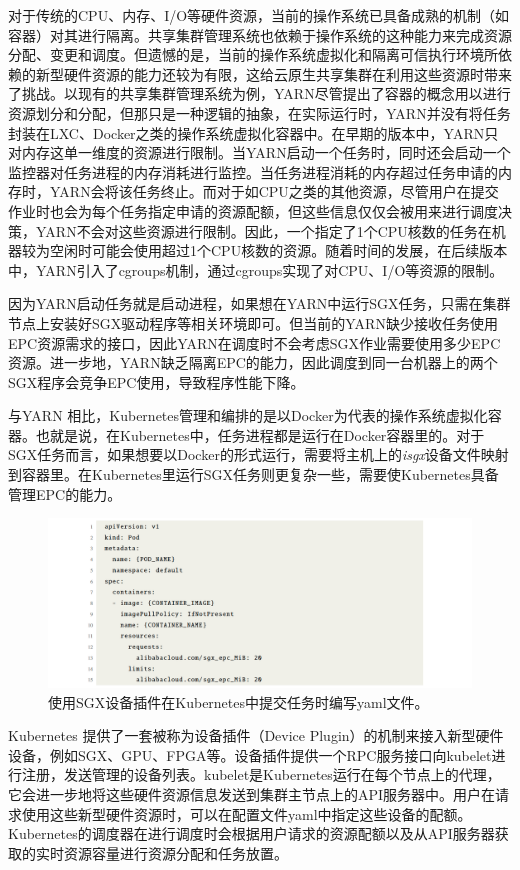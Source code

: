 对于传统的CPU、内存、I/O等硬件资源，当前的操作系统已具备成熟的机制（如容器）对其进行隔离。共享集群管理系统也依赖于操作系统的这种能力来完成资源分配、变更和调度。但遗憾的是，当前的操作系统虚拟化和隔离可信执行环境所依赖的新型硬件资源的能力还较为有限，这给云原生共享集群在利用这些资源时带来了挑战。以现有的共享集群管理系统为例，YARN尽管提出了容器的概念用以进行资源划分和分配，但那只是一种逻辑的抽象，在实际运行时，YARN并没有将任务封装在LXC、Docker之类的操作系统虚拟化容器中。在早期的版本中，YARN只对内存这单一维度的资源进行限制。当YARN启动一个任务时，同时还会启动一个监控器对任务进程的内存消耗进行监控。当任务进程消耗的内存超过任务申请的内存时，YARN会将该任务终止。而对于如CPU之类的其他资源，尽管用户在提交作业时也会为每个任务指定申请的资源配额，但这些信息仅仅会被用来进行调度决策，YARN不会对这些资源进行限制。因此，一个指定了1个CPU核数的任务在机器较为空闲时可能会使用超过1个CPU核数的资源。随着时间的发展，在后续版本中，YARN引入了cgroups机制，通过cgroups实现了对CPU、I/O等资源的限制。

因为YARN启动任务就是启动进程，如果想在YARN中运行SGX任务，只需在集群节点上安装好SGX驱动程序等相关环境即可。但当前的YARN缺少接收任务使用EPC资源需求的接口，因此YARN在调度时不会考虑SGX作业需要使用多少EPC资源。进一步地，YARN缺乏隔离EPC的能力，因此调度到同一台机器上的两个SGX程序会竞争EPC使用，导致程序性能下降。

与YARN 相比，Kubernetes管理和编排的是以Docker为代表的操作系统虚拟化容器。也就是说，在Kubernetes中，任务进程都是运行在Docker容器里的。对于SGX任务而言，如果想要以Docker的形式运行，需要将主机上的\textit{isgx}设备文件映射到容器里。在Kubernetes里运行SGX任务则更复杂一些，需要使Kubernetes具备管理EPC的能力。

\begin{figure}[h]
    \centerline{\includegraphics[width=\textwidth]{figures/k8s-yaml.png}}
    \caption{使用SGX设备插件在Kubernetes中提交任务时编写yaml文件。}
    \label{k8s_yaml}
\end{figure}

Kubernetes 提供了一套被称为设备插件（Device Plugin）的机制来接入新型硬件设备，例如SGX、GPU、FPGA等。设备插件提供一个RPC服务接口向kubelet进行注册，发送管理的设备列表。kubelet是Kubernetes运行在每个节点上的代理，它会进一步地将这些硬件资源信息发送到集群主节点上的API服务器中。用户在请求使用这些新型硬件资源时，可以在配置文件yaml中指定这些设备的配额。Kubernetes的调度器在进行调度时会根据用户请求的资源配额以及从API服务器获取的实时资源容量进行资源分配和任务放置。

